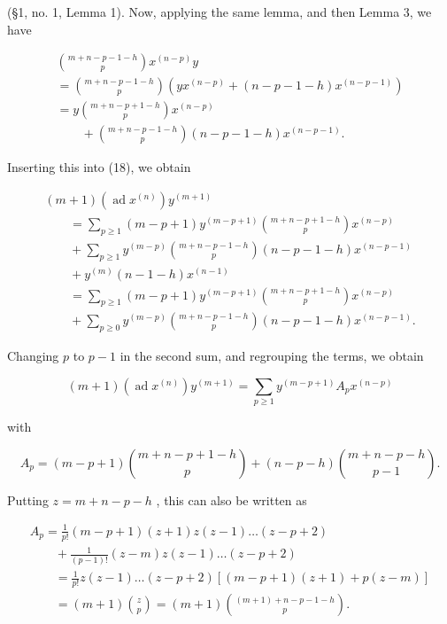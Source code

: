 (§1, no. 1, Lemma 1). Now, applying the same lemma, and then Lemma 3, we have

\[
\begin{array}{l} \binom {m + n - p - 1 - h} {p} x ^ {(n - p)} y \\ = \binom {m + n - p - 1 - h} {p} (y x ^ {(n - p)} + (n - p - 1 - h) x ^ {(n - p - 1)}) \\ = y \binom {m + n - p + 1 - h} {p} x ^ {(n - p)} \\ \qquad + \binom {m + n - p - 1 - h} {p} (n - p - 1 - h) x ^ {(n - p - 1)}. \end{array}
\]

Inserting this into (18), we obtain

\[
\begin{array}{l} (m + 1) (\operatorname{ad} x ^ {(n)}) y ^ {(m + 1)} \\ \qquad = \sum_ {p \geq 1} (m - p + 1) y ^ {(m - p + 1)} \binom {m + n - p + 1 - h} {p} x ^ {(n - p)} \\ \qquad + \sum_ {p \geq 1} y ^ {(m - p)} \binom {m + n - p - 1 - h} {p} (n - p - 1 - h) x ^ {(n - p - 1)} \\ \qquad + y ^ {(m)} (n - 1 - h) x ^ {(n - 1)} \\ \qquad = \sum_ {p \geq 1} (m - p + 1) y ^ {(m - p + 1)} \binom {m + n - p + 1 - h} {p} x ^ {(n - p)} \\ \qquad + \sum_ {p \geq 0} y ^ {(m - p)} \binom {m + n - p - 1 - h} {p} (n - p - 1 - h) x ^ {(n - p - 1)}. \end{array}
\]

Changing \(p\) to \(p - 1\) in the second sum, and regrouping the terms, we obtain

\[
(m + 1) (\operatorname{ad} x ^ {(n)}) y ^ {(m + 1)} = \sum_ {p \geq 1} y ^ {(m - p + 1)} A _ {p} x ^ {(n - p)}\tag{19}
\]

with

\[
A _ {p} = (m - p + 1) \binom{m + n - p + 1 - h}{p} + (n - p - h) \binom{m + n - p - h}{p - 1}.
\]

Putting \(z = m + n - p - h\) , this can also be written as

\[
\begin{array}{l} A _ {p} = \frac {1}{p !} (m - p + 1) (z + 1) z (z - 1) \dots (z - p + 2) \\ \qquad + \frac {1}{(p - 1) !} (z - m) z (z - 1) \dots (z - p + 2) \\ \qquad = \frac {1}{p !} z (z - 1) \dots (z - p + 2) [ (m - p + 1) (z + 1) + p (z - m) ] \\ \qquad = (m + 1) \binom {z} {p} = (m + 1) \binom {(m + 1) + n - p - 1 - h} {p}. \end{array}
\]

